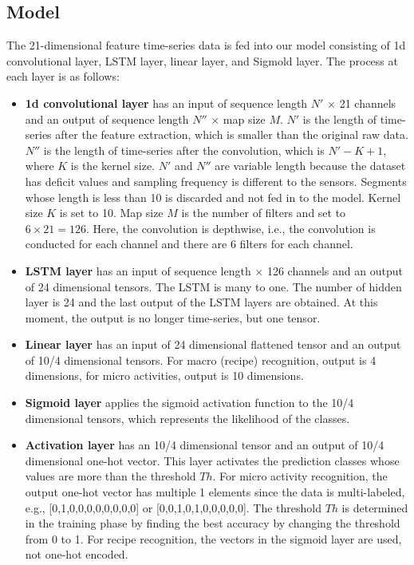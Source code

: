\documentclass{svmult}
\begin{document}
\subsection{Model}
The 21-dimensional feature time-series data is fed into our model consisting of 1d convolutional layer, LSTM layer, linear layer, and Sigmold layer. The process at each layer is as follows:
\begin{itemize}
    \item {\bf 1d convolutional layer} has an input of sequence length $N'$ $\times$ 21 channels and an output of sequence length $N''$ $\times$ map size $M$. $N'$ is the length of time-series after the feature extraction, which is smaller than the original raw data. $N''$ is the length of time-series after the convolution, which is $N'-K+1$, where $K$ is the kernel size. $N'$ and $N''$ are variable length because the dataset has deficit values and sampling frequency is different to the sensors. Segments whose length is less than 10 is discarded and not fed in to the model. Kernel size $K$ is set to 10. Map size $M$ is the number of filters and set to $6 \times 21 =126$. Here, the convolution is depthwise, i.e., the convolution is conducted for each channel and there are 6 filters for each channel.  
    
    \item {\bf LSTM layer} has an input of sequence length $\times$ 126 channels and an output of 24 dimensional tensors. The LSTM is many to one. The number of hidden layer is 24 and the last output of the LSTM layers are obtained. At this moment, the output is no longer time-series, but one tensor.
    
    \item {\bf Linear layer} has an input of 24 dimensional flattened tensor and an output of 10/4 dimensional tensors. For macro (recipe) recognition, output is 4 dimensions, for micro activities, output is 10 dimensions.
    
    \item {\bf Sigmoid layer} applies the sigmoid activation function to the 10/4 dimensional tensors, which represents the likelihood of the classes.
    
    \item {\bf Activation layer} has an 10/4 dimensional tensor and an output of 10/4 dimensional one-hot vector. This layer activates the prediction classes whose values are more than the threshold $Th$. For micro activity recognition, the output one-hot vector has multiple 1 elements since the data is multi-labeled, e.g., [0,1,0,0,0,0,0,0,0,0] or [0,0,1,0,1,0,0,0,0,0]. The threshold $Th$ is determined in the training phase by finding the best accuracy by changing the threshold from 0 to 1. For recipe recognition, the vectors in the sigmoid layer are used, not one-hot encoded. 
    
\end{itemize}
\end{document}
